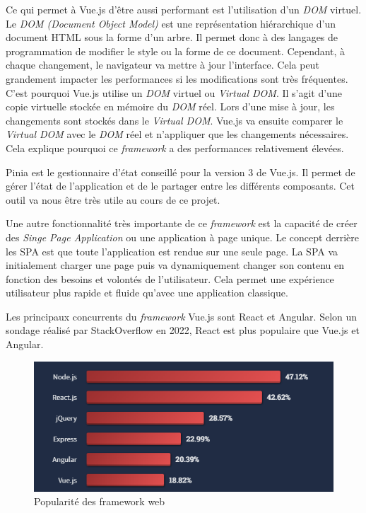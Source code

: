 Ce qui permet à Vue.js d'être aussi performant est l'utilisation d'un \emph{DOM} virtuel. Le \emph{DOM (Document Object Model)} est une représentation hiérarchique d'un document HTML sous la forme d'un arbre. Il permet donc à des langages de programmation de modifier le style ou la forme de ce document. Cependant, à chaque changement, le navigateur va mettre à jour l'interface. Cela peut grandement impacter les performances si les modifications sont très fréquentes. C'est pourquoi Vue.js utilise un \emph{DOM} virtuel ou \emph{Virtual DOM}. Il s'agit d'une copie virtuelle stockée en mémoire du \emph{DOM} réel. Lors d'une mise à jour, les changements sont stockés dans le \emph{Virtual DOM}. Vue.js va ensuite comparer le \emph{Virtual DOM} avec le \emph{DOM} réel et n'appliquer que les changements nécessaires. Cela explique pourquoi ce \emph{framework} a des performances relativement élevées.

Pinia est le gestionnaire d'état conseillé pour la version 3 de Vue.js. Il permet de gérer l'état de l'application et de le partager entre les différents composants. Cet outil va nous être très utile au cours de ce projet.

Une autre fonctionnalité très importante de ce \emph{framework} est la capacité de créer des \emph{Singe Page Application} ou une application à page unique. Le concept derrière les SPA est que toute l'application est rendue sur une seule page. La SPA va initialement charger une page puis va dynamiquement changer son contenu en fonction des besoins et volontés de l'utilisateur. Cela permet une expérience utilisateur plus rapide et fluide qu'avec une application classique.

Les principaux concurrents du \emph{framework} Vue.js sont React et Angular. Selon un sondage réalisé par StackOverflow \cite{StackoverflowSurvey} en 2022, React est plus populaire que Vue.js et Angular.
\begin{center}
    \begin{figure}[H]
        \includegraphics[width=\textwidth]{./assets/figures/VueVSReactVSAngular.png}
        \caption{Popularité des framework web \label{VueVSReactVSAngular.png}}
    \end{figure}
\end{center}


